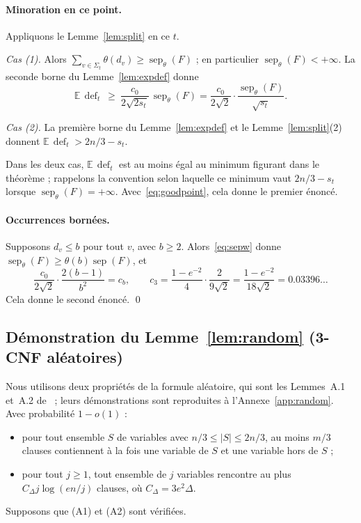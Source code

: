 \documentclass[11pt,a4paper]{article}
\theoremstyle{definition}
\theoremstyle{remark}
\newcommand{\E}{\mathbb{E}}
\newcommand{\sep}{\operatorname{sep}}
\newcommand{\sepw}{\operatorname{sep}_{\theta}}
\newcommand{\dfc}{\operatorname{def}}
\begin{document}
\paragraph{Minoration en ce point.} Appliquons le Lemme~\ref{lem:split} en ce $t$.

\emph{Cas (1).} Alors $\sum_{v\in\Sigma_t}\theta(d_v)\ge\sepw(F)$ ; en particulier
$\sepw(F)<+\infty$. La seconde borne du Lemme~\ref{lem:expdef} donne
\[
\E\,\dfc_t\ \ge\ \frac{c_0}{2\sqrt{2s_t}}\,\sepw(F)=\frac{c_0}{2\sqrt2}\cdot\frac{\sepw(F)}{\sqrt{s_t}} .
\]

\emph{Cas (2).} La première borne du Lemme~\ref{lem:expdef} et le Lemme~\ref{lem:split}(2)
donnent $\E\,\dfc_t>2n/3-s_t$.

Dans les deux cas, $\E\,\dfc_t$ est au moins égal au minimum figurant dans le théorème ;
rappelons la convention selon laquelle ce minimum vaut $2n/3-s_t$ lorsque
$\sepw(F)=+\infty$. Avec~\eqref{eq:goodpoint}, cela donne le premier énoncé.

\paragraph{Occurrences bornées.} Supposons $d_v\le b$ pour tout $v$, avec $b\ge2$.
Alors~\eqref{eq:sepw} donne $\sepw(F)\ge\theta(b)\sep(F)$, et
\[
\frac{c_0}{2\sqrt2}\cdot\frac{2(b-1)}{b^2}=c_b,\qquad
c_3=\frac{1-e^{-2}}{4}\cdot\frac{2}{9\sqrt2}=\frac{1-e^{-2}}{18\sqrt2}=0.03396\ldots
\]
Cela donne le second énoncé. \qed

\subsection{Démonstration du Lemme~\ref{lem:random} (3-CNF aléatoires)}

Nous utilisons deux propriétés de la formule aléatoire, qui sont les Lemmes~A.1 et~A.2
de~\cite{DL} ; leurs démonstrations sont reproduites à l'Annexe~\ref{app:random}. Avec
probabilité $1-o(1)$ :
\begin{itemize}
\item[(A1)] pour tout ensemble $S$ de variables avec $n/3\le|S|\le2n/3$, au moins $m/3$
 clauses contiennent à la fois une variable de $S$ et une variable hors de $S$ ;
\item[(A2)] pour tout $j\ge1$, tout ensemble de $j$ variables rencontre au plus
 $C_\Delta j\log(en/j)$ clauses, où $C_\Delta=3e^2\Delta$.
\end{itemize}
Supposons que (A1) et (A2) sont vérifiées.
\end{document}
